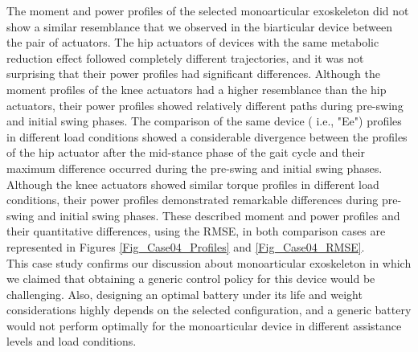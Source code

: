 \documentclass[10pt,letterpaper]{article}
\begin{document}
The moment and power profiles of the selected monoarticular exoskeleton did not show a similar resemblance that we observed in the biarticular device between the pair of actuators. The hip actuators of devices with the same metabolic reduction effect followed completely different trajectories, and it was not surprising that their power profiles had significant differences. Although the moment profiles of the knee actuators had a higher resemblance than the hip actuators, their power profiles showed relatively different paths during pre-swing and initial swing phases. The comparison of the same device ( i.e., "Ee") profiles in different load conditions showed a considerable divergence between the profiles of the hip actuator after the mid-stance phase of the gait cycle and their maximum difference occurred during the pre-swing and initial swing phases. Although the knee actuators showed similar torque profiles in different load conditions, their power profiles demonstrated remarkable differences during pre-swing and initial swing phases. These described moment and power profiles and their quantitative differences, using the RMSE, in both comparison cases are represented in Figures \ref{Fig_Case04_Profiles} and \ref{Fig_Case04_RMSE}.\\
This case study confirms our discussion about monoarticular exoskeleton in which we claimed that obtaining a generic control policy for this device would be challenging. Also, designing an optimal battery under its life and weight considerations highly depends on the selected configuration, and a generic battery would not perform optimally for the monoarticular device in different assistance levels and load conditions.
\end{document}
